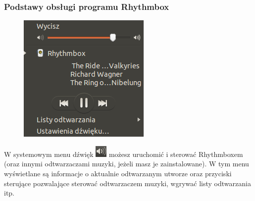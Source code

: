 \subsubsection{Podstawy obsługi programu Rhythmbox}
\begin{figure}
                \includegraphics[width=\linewidth]{images/programy_rhythmbox2.png}
\end{figure}

W systemowym menu dźwięk \includegraphics{images/ikony_dzwiek.png} możesz uruchomić i sterować Rhythmboxem (oraz innymi odtwarzaczami muzyki, jeżeli masz je zainstalowane). W tym menu wyświetlane są informacje o aktualnie odtwarzanym utworze oraz przyciski sterujące pozwalające sterować odtwarzaczem muzyki, wgrywać listy odtwarzania itp.


